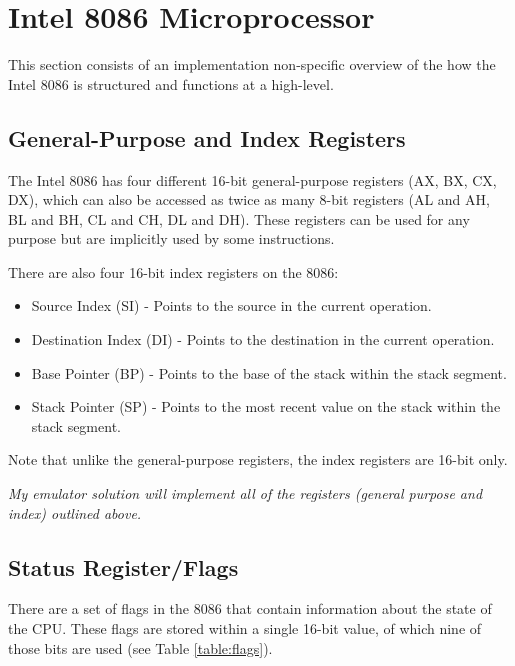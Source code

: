 \section{Intel 8086 Microprocessor}

This section consists of an implementation non-specific overview of the how the Intel 8086 is structured and functions at a high-level.

\subsection{General-Purpose and Index Registers}
    The Intel 8086 has four different 16-bit general-purpose registers (AX, BX, CX, DX), which can also be accessed as twice as many 8-bit registers (AL and AH, BL and BH, CL and CH, DL and DH). These registers can be used for any purpose but are implicitly used by some instructions.

    There are also four 16-bit index registers on the 8086:
    \begin{itemize}
        \item Source Index (SI) - Points to the source in the current operation.
        \item Destination Index (DI) - Points to the destination in the current operation.
        \item Base Pointer (BP) - Points to the base of the stack within the stack segment.
        \item Stack Pointer (SP) - Points to the most recent value on the stack within the stack segment.
    \end{itemize}
    Note that unlike the general-purpose registers, the index registers are 16-bit only.

    \textit{My emulator solution will implement all of the registers (general purpose and index) outlined above.}

\subsection{Status Register/Flags}
    There are a set of flags in the 8086 that contain information about the state of the CPU. These flags are stored within a single 16-bit value, of which nine of those bits are used (see Table \ref{table:flags}).

